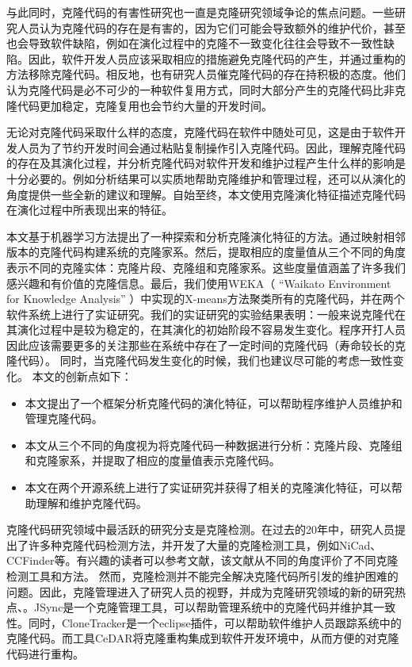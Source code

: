 与此同时，克隆代码的有害性研究也一直是克隆研究领域争论的焦点问题。一些研究人员认为克隆代码的存在是有害的，因为它们可能会导致额外的维护代价\cite{kapser2006cloning}，甚至也会导致软件缺陷，例如在演化过程中的克隆不一致变化往往会导致不一致性缺陷\cite{inoue2012experience}。因此，软件开发人员应该采取相应的措施避免克隆代码的产生，并通过重构的方法移除克隆代码。相反地，也有研究人员催克隆代码的存在持积极的态度。他们认为克隆代码是必不可少的一种软件复用方式，同时大部分产生的克隆代码比非克隆代码更加稳定，克隆复用也会节约大量的开发时间\cite{krinke2008cloned}。

无论对克隆代码采取什么样的态度，克隆代码在软件中随处可见，这是由于软件开发人员为了节约开发时间会通过粘贴复制操作引入克隆代码。因此，理解克隆代码的存在及其演化过程，并分析克隆代码对软件开发和维护过程产生什么样的影响是十分必要的。例如分析结果可以实质地帮助克隆维护和管理过程，还可以从演化的角度提供一些全新的建议和理解。自始至终，本文使用克隆演化特征描述克隆代码在演化过程中所表现出来的特征。

本文基于机器学习方法提出了一种探索和分析克隆演化特征的方法。通过映射相邻版本的克隆代码构建系统的克隆家系。然后，提取相应的度量值从三个不同的角度表示不同的克隆实体：克隆片段、克隆组和克隆家系。这些度量值涵盖了许多我们感兴趣和有价值的克隆信息。最后，我们使用WEKA（ “Waikato Environment for Knowledge Analysis” \cite{hall2009weka}）中实现的X-means\cite{pelleg2000x}方法聚类所有的克隆代码，并在两个软件系统上进行了实证研究。我们的实证研究的实验结果表明：一般来说克隆代在其演化过程中是较为稳定的，在其演化的初始阶段不容易发生变化。程序开打人员因此应该需要更多的关注那些在系统中存在了一定时间的克隆代码（寿命较长的克隆代码）。
同时，当克隆代码发生变化的时候，我们也建议尽可能的考虑一致性变化。
本文的创新点如下：
\begin{itemize}
\item 本文提出了一个框架分析克隆代码的演化特征，可以帮助程序维护人员维护和管理克隆代码。
\item 本文从三个不同的角度视为将克隆代码一种数据进行分析：克隆片段、克隆组和克隆家系，并提取了相应的度量值表示克隆代码。
\item 本文在两个开源系统上进行了实证研究并获得了相关的克隆演化特征，可以帮助理解和维护克隆代码。
\end{itemize}

克隆代码研究领域中最活跃的研究分支是克隆检测。在过去的20年中，研究人员提出了许多种克隆代码检测方法，并开发了大量的克隆检测工具，例如NiCad\cite{roy2008nicad}、CCFinder\cite{kamiya2002ccfinder}等。有兴趣的读者可以参考文献\cite{rattan2013software}，该文献从不同的角度评价了不同克隆检测工具和方法。
然而，克隆检测并不能完全解决克隆代码所引发的维护困难的问题。因此，克隆管理进入了研究人员的视野，并成为克隆研究领域的新的研究热点\cite{roy2014vision}、\cite{koschke2012software}。JSync是一个克隆管理工具，可以帮助管理系统中的克隆代码并维护其一致性\cite{nguyen2012clone}。同时，CloneTracker是一个eclipse插件，可以帮助软件维护人员跟踪系统中的克隆代码\cite{duala2008clonetracker}。而工具CeDAR将克隆重构集成到软件开发环境中，从而方便的对克隆代码进行重构\cite{tairas2010representation}。

